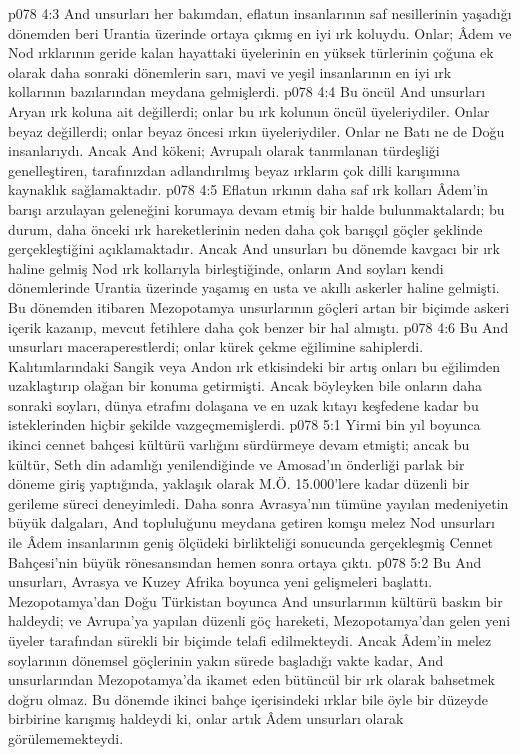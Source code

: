 \vs p078 4:3 And unsurları her bakımdan, eflatun insanlarının saf nesillerinin yaşadığı dönemden beri Urantia üzerinde ortaya çıkmış en iyi ırk koluydu. Onlar; Âdem ve Nod ırklarının geride kalan hayattaki üyelerinin en yüksek türlerinin çoğuna ek olarak daha sonraki dönemlerin sarı, mavi ve yeşil insanlarının en iyi ırk kollarının bazılarından meydana gelmişlerdi.
\vs p078 4:4 Bu öncül And unsurları Aryan ırk koluna ait değillerdi; onlar bu ırk kolunun öncül üyeleriydiler. Onlar beyaz değillerdi; onlar beyaz öncesi ırkın üyeleriydiler. Onlar ne Batı ne de Doğu insanlarıydı. Ancak And kökeni; Avrupalı olarak tanımlanan türdeşliği genelleştiren, tarafınızdan adlandırılmış beyaz ırkların çok dilli karışımına kaynaklık sağlamaktadır.
\vs p078 4:5 Eflatun ırkının daha saf ırk kolları Âdem’in barışı arzulayan geleneğini korumaya devam etmiş bir halde bulunmaktalardı; bu durum, daha önceki ırk hareketlerinin neden daha çok barışçıl göçler şeklinde gerçekleştiğini açıklamaktadır. Ancak And unsurları bu dönemde kavgacı bir ırk haline gelmiş Nod ırk kollarıyla birleştiğinde, onların And soyları kendi dönemlerinde Urantia üzerinde yaşamış en usta ve akıllı askerler haline gelmişti. Bu dönemden itibaren Mezopotamya unsurlarının göçleri artan bir biçimde askeri içerik kazanıp, mevcut fetihlere daha çok benzer bir hal almıştı.
\vs p078 4:6 Bu And unsurları maceraperestlerdi; onlar kürek çekme eğilimine sahiplerdi. Kalıtımlarındaki Sangik veya Andon ırk etkisindeki bir artış onları bu eğilimden uzaklaştırıp olağan bir konuma getirmişti. Ancak böyleyken bile onların daha sonraki soyları, dünya etrafını dolaşana ve en uzak kıtayı keşfedene kadar bu isteklerinden hiçbir şekilde vazgeçmemişlerdi.
\vs p078 5:1 Yirmi bin yıl boyunca ikinci cennet bahçesi kültürü varlığını sürdürmeye devam etmişti; ancak bu kültür, Seth din adamlığı yenilendiğinde ve Amosad’ın önderliği parlak bir döneme giriş yaptığında, yaklaşık olarak M.Ö. 15.000’lere kadar düzenli bir gerileme süreci deneyimledi. Daha sonra Avrasya’nın tümüne yayılan medeniyetin büyük dalgaları, And topluluğunu meydana getiren komşu melez Nod unsurları ile Âdem insanlarının geniş ölçüdeki birlikteliği sonucunda gerçekleşmiş Cennet Bahçesi’nin büyük rönesansından hemen sonra ortaya çıktı.
\vs p078 5:2 Bu And unsurları, Avrasya ve Kuzey Afrika boyunca yeni gelişmeleri başlattı. Mezopotamya’dan Doğu Türkistan boyunca And unsurlarının kültürü baskın bir haldeydi; ve Avrupa’ya yapılan düzenli göç hareketi, Mezopotamya’dan gelen yeni üyeler tarafından sürekli bir biçimde telafi edilmekteydi. Ancak Âdem’in melez soylarının dönemsel göçlerinin yakın sürede başladığı vakte kadar, And unsurlarından Mezopotamya’da ikamet eden bütüncül bir ırk olarak bahsetmek doğru olmaz. Bu dönemde ikinci bahçe içerisindeki ırklar bile öyle bir düzeyde birbirine karışmış haldeydi ki, onlar artık Âdem unsurları olarak görülememekteydi.
